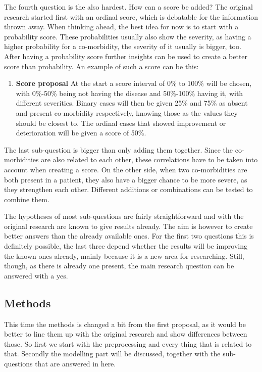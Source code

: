 \documentclass[10pt,a4paper]{report}
\begin{document}
	The fourth question is the also hardest. How can a score be added? The original research started first with an ordinal score, which is debatable for the information thrown away. When thinking ahead, the best idea for now is to start with a probability score. These probabilities usually also show the severity, as having a higher probability for a co-morbidity, the severity of it usually is bigger, too. After having a probability score further insights can be used to create a better score than probability. An example of such a score can be this:
	
	\begin{enumerate}
		\item[] \textbf{Score proposal} At the start a score interval of 0\% to 100\% will be chosen, with 0\%-50\% being not having the disease and 50\%-100\% having it, with different severities. Binary cases will then be given 25\% and 75\% as absent and present co-morbidity respectively, knowing those as the values they should be closest to. The ordinal cases that showed improvement or deterioration will be given a score of 50\%. 
	\end{enumerate}
	
	The last sub-question is bigger than only adding them together. Since the co-morbidities are also related to each other, these correlations have to be taken into account when creating a score. On the other side, when two co-morbidities are both present in a patient, they also have a bigger chance to be more severe, as they strengthen each other. Different additions or combinations can be tested to combine them.
	
	The hypotheses of most sub-questions are fairly straightforward and with the original research are known to give results already. The aim is however to create better answers than the already available ones. For the first two questions this is definitely possible, the last three depend whether the results will be improving the known ones already, mainly because it is a new area for researching. Still, though, as there is already one present, the main research question can be answered with a yes.
	
	\subsection{Methods}
	\label{subsec:FinalMethods}
	
	This time the methods is changed a bit from the first proposal, as it would be better to line them up with the original research and show differences between those. So first we start with the preprocessing and every thing that is related to that. Secondly the modelling part will be discussed, together with the sub-questions that are answered in here.
	
\end{document}
